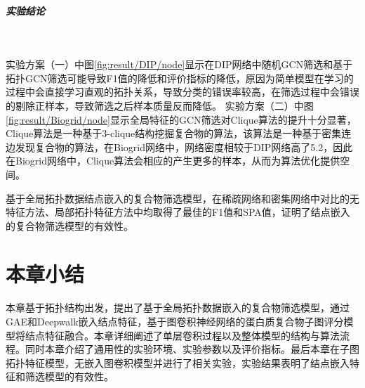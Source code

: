 \subparagraph*{实验结论} ~

实验方案（一）中图\ref{fig:result/DIP/node}显示在DIP网络中随机GCN筛选和基于拓扑GCN筛选可能导致F1值的降低和评价指标的降低，原因为简单模型在学习的过程中会直接学习直观的拓扑关系，导致分类的错误率较高，在筛选过程中会错误的剔除正样本，导致筛选之后样本质量反而降低。
实验方案（二）中图\ref{fig:result/Biogrid/node}显示全局特征的GCN筛选对Clique算法的提升十分显著，Clique算法是一种基于3-clique结构挖掘复合物的算法，该算法是一种基于密集连边发现复合物的算法，在Biogrid网络中，网络密度相较于DIP网络高了5.2，因此在Biogrid网络中，Clique算法会相应的产生更多的样本，从而为算法优化提供空间。

基于全局拓扑数据结点嵌入的复合物筛选模型，在稀疏网络和密集网络中对比的无特征方法、局部拓扑特征方法中均取得了最佳的F1值和SPA值，证明了结点嵌入的复合物筛选模型的有效性。

\section{本章小结}
\label{section:NodeConv:summary}

本章基于拓扑结构出发，提出了基于全局拓扑数据嵌入的复合物筛选模型，通过GAE和Deepwalk嵌入结点特征，基于图卷积神经网络的蛋白质复合物子图评分模型将结点特征融合。本章详细阐述了单层卷积过程以及整体模型的结构与算法流程。同时本章介绍了通用性的实验环境、实验参数以及评价指标。最后本章在子图拓扑特征模型，无嵌入图卷积模型并进行了相关实验，实验结果表明了结点嵌入特征和筛选模型的有效性。
